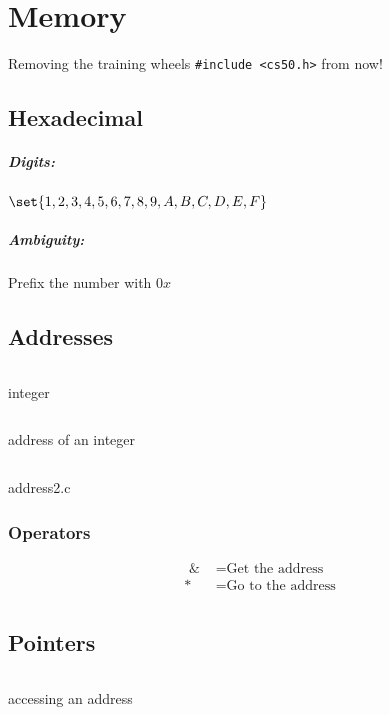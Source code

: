 \chapter{Memory}
Removing the training wheels \texttt{#include <cs50.h>} from now!

\section{Hexadecimal}
\paragraph{Digits:}$\set{1, 2, 3, 4, 5, 6, 7, 8, 9, A, B, C, D, E, F}$
\paragraph{Ambiguity:} Prefix the number with $0x$

\section{Addresses}
\begin{code}
	\inputminted[linenos, breaklines]{c}{codes/src4/address0.c}
	\caption{integer}
\end{code}

\clearpage
\begin{code}
	\inputminted[linenos, breaklines]{c}{codes/src4/address1.c}
	\caption{address of an integer}
\end{code}

\begin{code}
	\inputminted[linenos, breaklines]{c}{codes/src4/address2.c}
	\caption{address2.c}
\end{code}

\subsection{Operators}
\begin{align*}
	\texttt{   & }                          & = \text{Get the address} \\
	\texttt{*} & = \text{Go to the address}                            \\
\end{align*}

\clearpage
\section{Pointers}
\begin{code}
	\inputminted[linenos, breaklines]{c}{codes/src4/address3.c}
	\caption{accessing an address}
\end{code}

